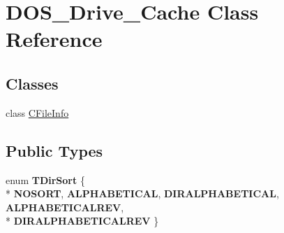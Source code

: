 \hypertarget{classDOS__Drive__Cache}{\section{D\-O\-S\-\_\-\-Drive\-\_\-\-Cache Class Reference}
\label{classDOS__Drive__Cache}
}
\subsection*{Classes}
\begin{DoxyCompactItemize}
\item 
class \hyperlink{classDOS__Drive__Cache_1_1CFileInfo}{C\-File\-Info}
\end{DoxyCompactItemize}
\subsection*{Public Types}
\begin{DoxyCompactItemize}
\item 
enum {\bfseries T\-Dir\-Sort} \{ \\*
{\bfseries N\-O\-S\-O\-R\-T}, 
{\bfseries A\-L\-P\-H\-A\-B\-E\-T\-I\-C\-A\-L}, 
{\bfseries D\-I\-R\-A\-L\-P\-H\-A\-B\-E\-T\-I\-C\-A\-L}, 
{\bfseries A\-L\-P\-H\-A\-B\-E\-T\-I\-C\-A\-L\-R\-E\-V}, 
\\*
{\bfseries D\-I\-R\-A\-L\-P\-H\-A\-B\-E\-T\-I\-C\-A\-L\-R\-E\-V}
 \}
\end{DoxyCompactItemize}
